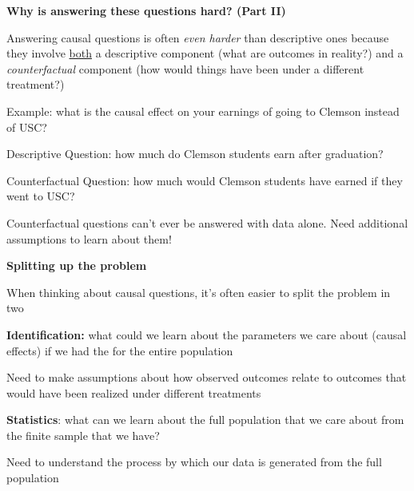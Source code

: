 \documentclass[11pt, aspectratio=169]{beamer}
\newenvironment{wideitemize}{\itemize\addtolength{\itemsep}{5pt}}{\enditemize}
\begin{document}
\begin{frame}{\bf \large Why is answering these questions hard? (Part II)}
\begin{wideitemize}
	\item
	Answering causal questions is often \textit{even harder} than descriptive ones because they involve \underline{both} a descriptive component (what are outcomes in reality?) and a \textit{counterfactual} component (how would things have been under a different treatment?)
	
	\pause
	\item
	Example: what is the causal effect on your earnings of going to Clemson instead of USC? 
		\begin{wideitemize}
			\item
			Descriptive Question: how much do Clemson students earn after graduation? 
			
			\item
			Counterfactual Question: how much would Clemson students have earned if they went to USC?  
		\end{wideitemize}
		

	\item Counterfactual questions can't ever be answered with data alone. Need additional assumptions to learn about them!	
\end{wideitemize}	
\end{frame}



\begin{frame}{\bf \large Splitting up the problem}
	\begin{wideitemize}
		
		\item
		When thinking about causal questions, it's often easier to split the problem in two
		
		\item
		\textbf{Identification:} what could we learn about the parameters we care about (causal effects) if we had the  for the entire population
		\begin{wideitemize}
			\item 
			Need to make assumptions about how observed outcomes relate to outcomes that would have been realized under different treatments
		\end{wideitemize}
		
		\item
		\textbf{Statistics}: what can we learn about the full population that we care about from the finite sample that we have?
			\begin{wideitemize}
				\item 
				Need to understand the process by which our data is generated from the full population
			\end{wideitemize} 	
		
	\end{wideitemize}	
	
\end{frame}
\end{document}
